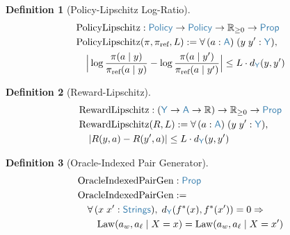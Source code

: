 \documentclass[11pt]{article}
\theoremstyle{definition}
\newtheorem{defnenv}{Definition}
\theoremstyle{plain}
\newcommand{\ty}[1]{\textcolor{type}{\mathsf{#1}}}
\newcommand{\fn}[1]{\mathrm{#1}}
\newcommand{\all}{\forall\,}
\newcommand{\arr}{\to}
\newcommand{\Arr}{\Rightarrow}
\newcommand{\defeq}{:=}
\newcommand{\Strings}{\ty{Strings}}
\newcommand{\Y}{\ty{Y}}
\newcommand{\A}{\ty{A}}
\newcommand{\Rnn}{\mathbb{R}_{\geq 0}}
\newcommand{\R}{\mathbb{R}}
\newcommand{\Prop}{\ty{Prop}}
\newcommand{\fstar}{f^*}
\newcommand{\dY}{d_{\Y}}
\begin{document}
\begin{defnenv}[Policy-Lipschitz Log-Ratio]
\label{def:policy_lip}
\begin{align*}
&\fn{PolicyLipschitz} : \ty{Policy} \arr \ty{Policy} \arr \Rnn \arr \Prop \\
&\fn{PolicyLipschitz}(\pi, \pi_{\text{ref}}, L) \defeq \all (a : \A)\; (y\; y' : \Y), \\
&\quad \Big|\log\frac{\pi(a \mid y)}{\pi_{\text{ref}}(a \mid y)} - \log\frac{\pi(a \mid y')}{\pi_{\text{ref}}(a \mid y')}\Big| \leq L \cdot \dY(y, y')
\end{align*}
\end{defnenv}

\begin{defnenv}[Reward-Lipschitz]
\label{def:reward_lip}
\begin{align*}
&\fn{RewardLipschitz} : (\Y \arr \A \arr \R) \arr \Rnn \arr \Prop \\
&\fn{RewardLipschitz}(R, L) \defeq \all (a : \A)\; (y\; y' : \Y), \\
&\quad |R(y, a) - R(y', a)| \leq L \cdot \dY(y, y')
\end{align*}
\end{defnenv}

\begin{defnenv}[Oracle-Indexed Pair Generator]
\label{def:pair_gen}
\begin{align*}
&\fn{OracleIndexedPairGen} : \Prop \\
&\fn{OracleIndexedPairGen} \defeq \\
&\quad \all (x\; x' : \Strings),\; \dY(\fstar(x), \fstar(x')) = 0 \Arr \\
&\quad\quad \fn{Law}(a_w, a_\ell \mid X = x) = \fn{Law}(a_w, a_\ell \mid X = x')
\end{align*}
\end{defnenv}
\end{document}
